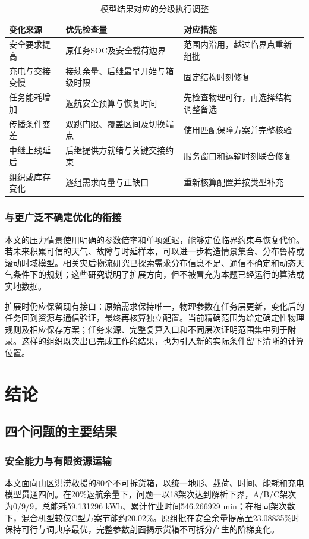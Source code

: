 \documentclass[withoutpreface,colorprint]{format}
\numberwithin{equation}{section}
\numberwithin{figure}{section}
\numberwithin{table}{section}
\begin{document}
\begin{table}[htbp]\centering\small
\caption{模型结果对应的分级执行调整}\label{tab:execution_policy}
\begin{tabularx}{\linewidth}{>{\raggedright\arraybackslash}p{2.2cm}LL}\toprule
变化来源 & 优先检查量 & 对应措施\\\midrule
安全要求提高 & 原任务SOC及安全载荷边界 & 范围内沿用，越过临界点重新组批\\
充电与交接变慢 & 接续余量、后继最早开始与箱级时限 & 固定结构时刻修复\\
任务能耗增加 & 返航安全预算与恢复时间 & 先检查物理可行，再选择结构调整备选\\
传播条件变差 & 双跳门限、覆盖区间及切换端点 & 使用匹配保障方案并完整核验\\
中继上线延后 & 后继提供方就绪与关键交接约束 & 服务窗口和运输时刻联合修复\\
组织或库存变化 & 逐组需求向量与正缺口 & 重新核算配置并按类型补充\\\bottomrule
\end{tabularx}\end{table}

\subsubsection{与更广泛不确定优化的衔接}
本文的压力情景使用明确的参数倍率和单项延迟，能够定位临界约束与恢复代价。若未来积累可信的天气、故障与时延样本，可以进一步构造情景集合、分布鲁棒或滚动时域模型。相关灾后物流研究已探索需求分布信息不足、通信不确定和动态天气条件下的规划\cite{xin2025,dukkanci2026,li2025hurricane,zhang2026communication}；这些研究说明了扩展方向，但不被冒充为本题已经运行的算法或实地数据。

扩展时仍应保留现有接口：原始需求保持唯一，物理参数在任务层更新，变化后的任务回到资源与通信验证，最终再核算独立配置。当前精确范围为给定确定性物理规则及相应保存方案；任务来源、完整复算入口和不同层次证明范围集中列于附录。这样的组织既突出已完成工作的结果，也为引入新的实际条件留下清晰的计算位置。


\section{结论}
\label{sec:conclusion}
\subsection{四个问题的主要结果}
\subsubsection{安全能力与有限资源运输}
本文面向山区洪涝救援的80个不可拆货箱，以统一地形、载荷、时间、能耗和充电模型贯通四问。在20\%返航余量下，问题一以18架次达到解析下界，A/B/C架次为0/9/9，总能耗59.131296 kWh、累计作业时间546.266929 min；在相同架次数下，混合机型较仅C型方案节能约20.02\%。原组批在安全余量提高至23.08835\%时保持可行与词典序最优，完整参数剖面揭示货箱不可拆分产生的阶梯变化。
\end{document}
